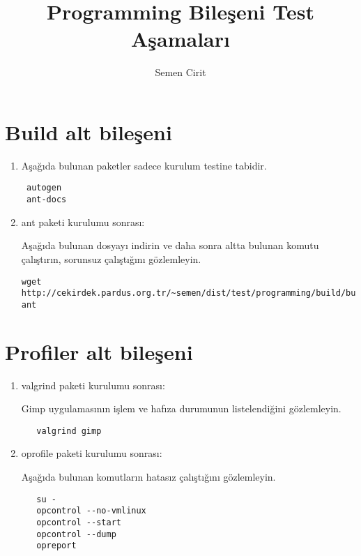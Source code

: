 \documentclass[a4paper,10pt]{article}
\title{Programming Bileşeni Test Aşamaları}
\author{Semen Cirit}
\begin{document}
\maketitle
\section{Build alt bileşeni}
\begin{enumerate}
 \item Aşağıda bulunan paketler sadece kurulum testine tabidir.
\begin{verbatim}
 autogen
 ant-docs
\end{verbatim}

\item ant paketi kurulumu sonrası:

Aşağıda bulunan dosyayı indirin ve daha sonra altta bulunan komutu çalıştırın, sorunsuz çalıştığını gözlemleyin.

\begin{verbatim}
wget http://cekirdek.pardus.org.tr/~semen/dist/test/programming/build/build.xml
ant
\end{verbatim}

\end{enumerate}


\section{Profiler alt bileşeni}
\begin{enumerate}
 \item valgrind paketi kurulumu sonrası:

Gimp uygulamasının işlem ve hafıza durumunun listelendiğini gözlemleyin.

  \begin{verbatim}
   valgrind gimp
  \end{verbatim}


 \item oprofile paketi kurulumu sonrası:

Aşağıda bulunan komutların hatasız çalıştığını gözlemleyin.
  \begin{verbatim}
   su -
   opcontrol --no-vmlinux
   opcontrol --start
   opcontrol --dump
   opreport
  \end{verbatim}

\end{enumerate}
\end{document}
